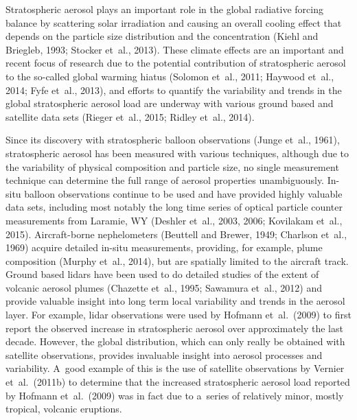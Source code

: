 \documentclass[amtd, online, hvmath]{copernicus}
\begin{document}
\introduction

Stratospheric aerosol plays an important role in the global radiative
forcing balance by scattering solar irradiation and causing an overall
cooling effect that depends on the particle size distribution and the
concentration (Kiehl and Briegleb, 1993; Stocker et~al., 2013). These
climate effects are an important and recent focus of research due to
the potential contribution of stratospheric aerosol to the so-called
global warming hiatus (Solomon et~al., 2011; Haywood et~al., 2014;
Fyfe et~al., 2013), and efforts to quantify the variability and trends
in the global stratospheric aerosol load are underway with various
ground based and satellite data sets (Rieger et~al., 2015; Ridley
et~al., 2014).

Since its discovery with stratospheric balloon observations (Junge
et~al., 1961), stratospheric aerosol has been measured with various
techniques, although due to the variability of physical composition
and particle size, no single measurement technique can determine the full range of aerosol properties unambiguously. In-situ balloon observations continue to be used and have
provided highly valuable data sets, including most notably the long
time series of optical particle counter measurements from Laramie, WY
(Deshler et~al., 2003, 2006; Kovilakam et~al., 2015). Aircraft-borne
nephelometers (Beuttell and Brewer, 1949; Charlson et~al., 1969)
acquire detailed in-situ measurements, providing, for example, plume
composition (Murphy et~al., 2014), but are spatially limited to the
aircraft track. Ground based lidars have been used to do detailed
studies of the extent of volcanic aerosol plumes (Chazette et~al.,
1995; Sawamura et~al., 2012) and provide valuable insight into long
term local variability and trends in the aerosol layer. For example,
lidar observations were used by Hofmann et~al.~(2009) to first report
the observed increase in stratospheric aerosol over approximately the
last decade. However, the global distribution, which can only really
be obtained with satellite observations, provides invaluable insight
into aerosol processes and variability. A~good example of this is the
use of satellite observations by Vernier et~al.~(2011b) to determine
that the increased stratospheric aerosol load reported by Hofmann
et~al.~(2009) was in fact due to a~series of relatively minor, mostly
tropical, volcanic eruptions.
\end{document}
